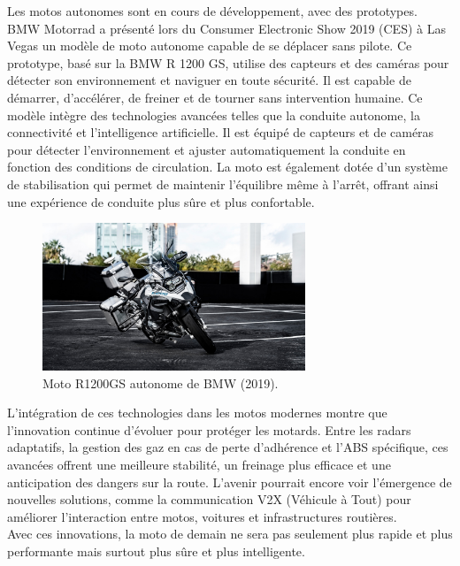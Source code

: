 Les motos autonomes sont en cours de développement, avec des prototypes. BMW Motorrad a présenté lors du Consumer Electronic Show 2019 (CES) à Las Vegas \cite{moto_autonome} un modèle de moto autonome capable de se déplacer sans pilote. Ce prototype, basé sur la BMW R 1200 GS, utilise des capteurs et des caméras pour détecter son environnement et naviguer en toute sécurité. Il est capable de démarrer, d’accélérer, de freiner et de tourner sans intervention humaine. 
Ce modèle intègre des technologies avancées telles que la conduite autonome, la connectivité et l’intelligence artificielle. Il est équipé de capteurs et de caméras pour détecter l’environnement et ajuster automatiquement la conduite en fonction des conditions de circulation. La moto est également dotée d’un système de stabilisation qui permet de maintenir l’équilibre même à l’arrêt, offrant ainsi une expérience de conduite plus sûre et plus confortable.

\begin{figure}[H]
    \centering
    \includegraphics[width=0.7\textwidth]{etat_art/images/bmw.jpeg} 
    \caption{Moto R1200GS autonome de BMW (2019).}
\end{figure}


L’intégration de ces technologies dans les motos modernes montre que l’innovation continue d’évoluer pour protéger les motards. Entre les radars adaptatifs, la gestion des gaz en cas de perte d’adhérence et l’ABS spécifique, ces avancées offrent une meilleure stabilité, un freinage plus efficace et une anticipation des dangers sur la route. L’avenir pourrait encore voir l’émergence de nouvelles solutions, comme la communication V2X (Véhicule à Tout) pour améliorer l’interaction entre motos, voitures et infrastructures routières.\\
Avec ces innovations, la moto de demain ne sera pas seulement plus rapide et plus performante mais surtout plus sûre et plus intelligente. 

